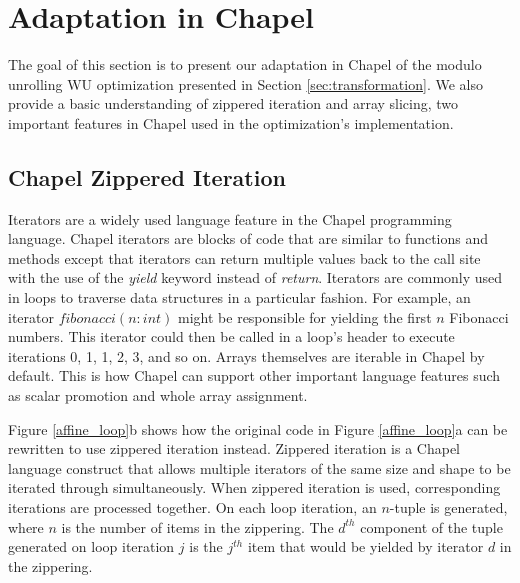 \section{Adaptation in Chapel}\label{sec:adaptation_in_chapel}


The goal of this section is to present our adaptation in Chapel of the modulo unrolling WU optimization presented in Section \ref{sec:transformation}. We also provide a basic understanding of zippered iteration and array slicing, two important features in Chapel used in the optimization's implementation. 

\subsection{Chapel Zippered Iteration}\label{sec:zippered_iteration}

Iterators are a widely used language feature in the Chapel programming language. Chapel iterators are blocks of code that are similar to functions and methods except that iterators can return multiple values back to the call site with the use of the \textit{yield} keyword instead of \textit{return}. Iterators are commonly used in loops to traverse data structures in a particular fashion. For example, an iterator $fibonacci(n: int)$ might be responsible for yielding the first $n$ Fibonacci numbers. This iterator could then be called in a loop's header to execute iterations 0, 1, 1, 2, 3, and so on. Arrays themselves are iterable in Chapel by default. This is how Chapel can support other important language features such as scalar promotion and whole array assignment. 

Figure \ref{affine_loop}b shows how the original code in Figure \ref{affine_loop}a can be rewritten to use zippered iteration \cite{chamberlain2011user} instead. Zippered iteration is a Chapel language construct that allows multiple iterators of the same size and shape to be iterated through simultaneously. When zippered iteration is used, corresponding iterations are processed together. On each loop iteration, an $n$-tuple is generated, where $n$ is the number of items in the zippering. The $d^{th}$ component of the tuple generated on loop iteration $j$ is the $j^{th}$ item that would be yielded by iterator $d$ in the zippering. 

